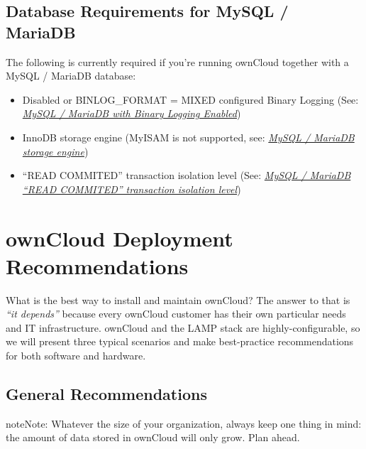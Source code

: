 \documentclass[letterpaper,10pt,english]{sphinxmanual}
\begin{document}
\subsection{Database Requirements for MySQL / MariaDB}
\label{installation/system_requirements:database-requirements-for-mysql-mariadb}
The following is currently required if you're running ownCloud together with a MySQL / MariaDB database:
\begin{itemize}
\item {} 
Disabled or BINLOG\_FORMAT = MIXED configured Binary Logging (See: {\hyperref[configuration_database/linux_database_configuration:db\string-binlog\string-label]{\emph{MySQL / MariaDB with Binary Logging Enabled}}})

\item {} 
InnoDB storage engine (MyISAM is not supported, see: {\hyperref[configuration_database/linux_database_configuration:db\string-storage\string-engine\string-label]{\emph{MySQL / MariaDB storage engine}}})

\item {} 
``READ COMMITED'' transaction isolation level (See: {\hyperref[configuration_database/linux_database_configuration:db\string-transaction\string-label]{\emph{MySQL / MariaDB ``READ COMMITED'' transaction isolation level}}})

\end{itemize}


\section{ownCloud Deployment Recommendations}
\label{installation/deployment_recommendations::doc}\label{installation/deployment_recommendations:owncloud-deployment-recommendations}
What is the best way to install and maintain ownCloud? The answer to that is
\emph{``it depends''} because every ownCloud customer has their own
particular needs and IT infrastructure. ownCloud and the LAMP stack are
highly-configurable, so we will present three typical scenarios and make
best-practice recommendations for both software and hardware.


\subsection{General Recommendations}
\label{installation/deployment_recommendations:general-recommendations}
\begin{notice}{note}{Note:}
Whatever the size of your organization, always keep one thing in mind:
the amount of data stored in ownCloud will only grow. Plan ahead.
\end{notice}
\end{document}
